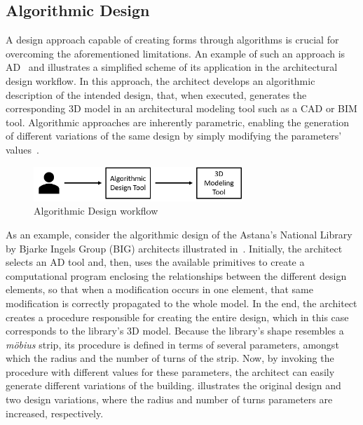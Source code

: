 \subsection{Algorithmic Design}
\label{ssec:ad}
	A design approach capable of creating forms through algorithms is crucial for overcoming the aforementioned limitations. An example of such an approach is \ac{AD}~\cite{Branco2017AD} and  illustrates a simplified scheme of its application in the architectural design workflow. In this approach, the architect develops an algorithmic description of the intended design, that, when executed, generates the corresponding 3D model in an architectural modeling tool such as a \ac{CAD} or \ac{BIM} tool. Algorithmic approaches are inherently parametric, enabling the generation of different variations of the same design by simply modifying the parameters' values~\cite{Leitao2014GD}. 
	
\begin{figure}[htbp]
\centering
\includegraphics[width=0.70\textwidth]{./Images/Introduction/AlgorithmicArchitecturalDesign.png}
\caption[General view of the Algorithmic Design Approach]{Algorithmic Design workflow}
\label{fig:algorithmicdesign}
\end{figure}
	
	As an example, consider the algorithmic design of the Astana's National Library by Bjarke Ingels Group (BIG) architects illustrated in~. Initially, the architect selects an \ac{AD} tool and, then, uses the available primitives to create a computational program enclosing the relationships between the different design elements, so that when a modification occurs in one element, that same modification is correctly propagated to the whole model. In the end, the architect creates a procedure responsible for creating the entire design, which in this case corresponds to the library's 3D model. Because the library's shape resembles a \textit{möbius} strip, its procedure is defined in terms of several parameters, amongst which the radius and the number of turns of the strip. Now, by invoking the procedure with different values for these parameters, the architect can easily generate different variations of the building.  illustrates the original design and two design variations, where the radius and number of turns parameters are increased, respectively. 
	
